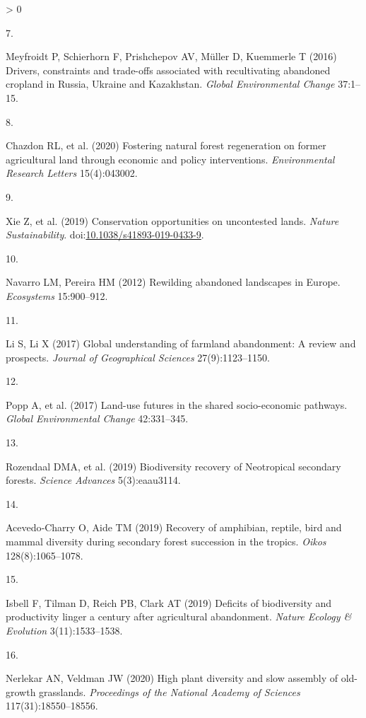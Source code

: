 \documentclass[9pt,twocolumn,twoside,]{pnas-new}
\newlength{\csllabelwidth}
\newlength{\cslhangindent}
\newenvironment{CSLReferences}[2] %
 {%
  \setlength{\parindent}{0pt}
  \ifodd #1 \everypar{\setlength{\hangindent}{\cslhangindent}}\ignorespaces\fi
  \ifnum #2 > 0
  \setlength{\parskip}{#2\baselineskip}
  \fi
 }%
 {}
\newcommand{\CSLLeftMargin}[1]{\parbox[t]{\csllabelwidth}{#1}}
\newcommand{\CSLRightInline}[1]{\parbox[t]{\linewidth - \csllabelwidth}{#1}\break}
\begin{document}
\begin{CSLReferences}{0}{0}
\leavevmode\hypertarget{ref-Meyfroidt2016}{}%
\CSLLeftMargin{7. }
\CSLRightInline{Meyfroidt P, Schierhorn F, Prishchepov AV, Müller D,
Kuemmerle T (2016) {Drivers, constraints and trade-offs associated with
recultivating abandoned cropland in Russia, Ukraine and Kazakhstan}.
\emph{Global Environmental Change} 37:1--15.}

\leavevmode\hypertarget{ref-Chazdon2020}{}%
\CSLLeftMargin{8. }
\CSLRightInline{Chazdon RL, et al. (2020) {Fostering natural forest
regeneration on former agricultural land through economic and policy
interventions}. \emph{Environmental Research Letters} 15(4):043002.}

\leavevmode\hypertarget{ref-Xie2019}{}%
\CSLLeftMargin{9. }
\CSLRightInline{Xie Z, et al. (2019) {Conservation opportunities on
uncontested lands}. \emph{Nature Sustainability}.
doi:\href{https://doi.org/10.1038/s41893-019-0433-9}{10.1038/s41893-019-0433-9}.}

\leavevmode\hypertarget{ref-Navarro2012}{}%
\CSLLeftMargin{10. }
\CSLRightInline{Navarro LM, Pereira HM (2012) {Rewilding abandoned
landscapes in Europe}. \emph{Ecosystems} 15:900--912.}

\leavevmode\hypertarget{ref-Li2017}{}%
\CSLLeftMargin{11. }
\CSLRightInline{Li S, Li X (2017) {Global understanding of farmland
abandonment: A review and prospects}. \emph{Journal of Geographical
Sciences} 27(9):1123--1150.}

\leavevmode\hypertarget{ref-Popp2017}{}%
\CSLLeftMargin{12. }
\CSLRightInline{Popp A, et al. (2017) {Land-use futures in the shared
socio-economic pathways}. \emph{Global Environmental Change}
42:331--345.}

\leavevmode\hypertarget{ref-Rozendaal2019}{}%
\CSLLeftMargin{13. }
\CSLRightInline{Rozendaal DMA, et al. (2019) {Biodiversity recovery of
Neotropical secondary forests}. \emph{Science Advances} 5(3):eaau3114.}

\leavevmode\hypertarget{ref-Acevedo-Charry2019}{}%
\CSLLeftMargin{14. }
\CSLRightInline{Acevedo‐Charry O, Aide TM (2019) {Recovery of amphibian,
reptile, bird and mammal diversity during secondary forest succession in
the tropics}. \emph{Oikos} 128(8):1065--1078.}

\leavevmode\hypertarget{ref-Isbell2019}{}%
\CSLLeftMargin{15. }
\CSLRightInline{Isbell F, Tilman D, Reich PB, Clark AT (2019) {Deficits
of biodiversity and productivity linger a century after agricultural
abandonment}. \emph{Nature Ecology {\&} Evolution} 3(11):1533--1538.}

\leavevmode\hypertarget{ref-Nerlekar2020}{}%
\CSLLeftMargin{16. }
\CSLRightInline{Nerlekar AN, Veldman JW (2020) {High plant diversity and
slow assembly of old-growth grasslands}. \emph{Proceedings of the
National Academy of Sciences} 117(31):18550--18556.}


\end{CSLReferences}
\end{document}
